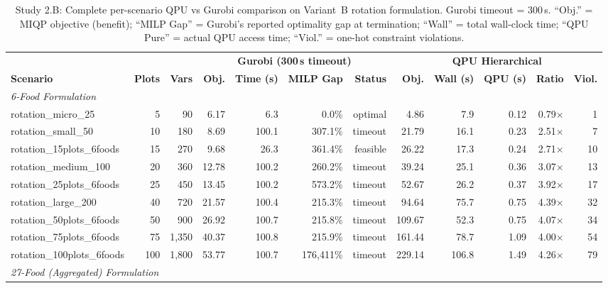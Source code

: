 \documentclass{oqireport}
\begin{document}
\begin{table}[H]
\centering
\caption{Study 2.B: Complete per-scenario QPU vs Gurobi comparison on Variant~B rotation formulation. Gurobi timeout = 300\,s. ``Obj.'' = MIQP objective (benefit); ``MILP Gap'' = Gurobi's reported optimality gap at termination; ``Wall'' = total wall-clock time; ``QPU Pure'' = actual QPU access time; ``Viol.'' = one-hot constraint violations.}
\label{tab:study2b_full_results}
\small
\begin{adjustbox}{max width=\textwidth}
\begin{tabular}{l r r r r r r r r r r r}
\toprule
 & & & \multicolumn{4}{c}{\textbf{Gurobi (300\,s timeout)}} & \multicolumn{5}{c}{\textbf{QPU Hierarchical}} \\
\cmidrule(lr){4-7} \cmidrule(lr){8-12}
\textbf{Scenario} & \textbf{Plots} & \textbf{Vars} & \textbf{Obj.} & \textbf{Time (s)} & \textbf{MILP Gap} & \textbf{Status} & \textbf{Obj.} & \textbf{Wall (s)} & \textbf{QPU (s)} & \textbf{Ratio} & \textbf{Viol.} \\
\midrule
\multicolumn{12}{l}{\textit{6-Food Formulation}} \\
\midrule
rotation\_micro\_25 & 5 & 90 & 6.17 & 6.3 & 0.0\% & optimal & 4.86 & 7.9 & 0.12 & 0.79$\times$ & 1 \\
rotation\_small\_50 & 10 & 180 & 8.69 & 100.1 & 307.1\% & timeout & 21.79 & 16.1 & 0.23 & 2.51$\times$ & 7 \\
rotation\_15plots\_6foods & 15 & 270 & 9.68 & 26.3 & 361.4\% & feasible & 26.22 & 17.3 & 0.24 & 2.71$\times$ & 10 \\
rotation\_medium\_100 & 20 & 360 & 12.78 & 100.2 & 260.2\% & timeout & 39.24 & 25.1 & 0.36 & 3.07$\times$ & 13 \\
rotation\_25plots\_6foods & 25 & 450 & 13.45 & 100.2 & 573.2\% & timeout & 52.67 & 26.2 & 0.37 & 3.92$\times$ & 17 \\
rotation\_large\_200 & 40 & 720 & 21.57 & 100.4 & 215.3\% & timeout & 94.64 & 75.7 & 0.75 & 4.39$\times$ & 32 \\
rotation\_50plots\_6foods & 50 & 900 & 26.92 & 100.7 & 215.8\% & timeout & 109.67 & 52.3 & 0.75 & 4.07$\times$ & 34 \\
rotation\_75plots\_6foods & 75 & 1,350 & 40.37 & 100.8 & 215.9\% & timeout & 161.44 & 78.7 & 1.09 & 4.00$\times$ & 54 \\
rotation\_100plots\_6foods & 100 & 1,800 & 53.77 & 100.7 & 176,411\% & timeout & 229.14 & 106.8 & 1.49 & 4.26$\times$ & 79 \\
\midrule
\multicolumn{12}{l}{\textit{27-Food (Aggregated) Formulation}} \\

\end{tabular}
\end{adjustbox}
\end{table}
\end{document}
